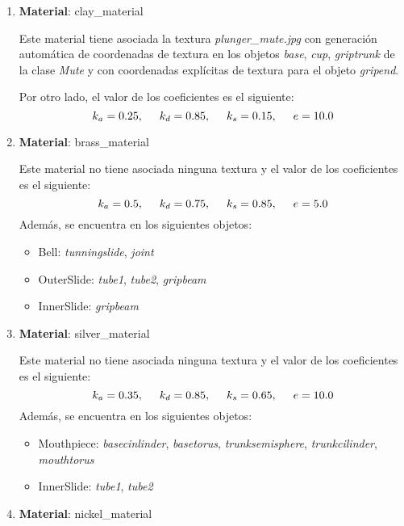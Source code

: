 \documentclass[10pt, a4paper]{article}
\begin{document}
\begin{enumerate}
	\item \textbf{Material}: clay\_material
	
	Este material tiene asociada la textura \emph{plunger\_mute.jpg} con generación automática de coordenadas de textura en los objetos \emph{base}, \emph{cup}, \emph{griptrunk} de la clase \emph{Mute} y con coordenadas explícitas de textura para el objeto \emph{gripend}.

	Por otro lado, el valor de los coeficientes es el siguiente:
	\begin{equation*}
		k_a = 0.25, \hspace{0.5cm} k_d = 0.85, \hspace{0.5cm} k_s = 0.15, \hspace{0.5cm} e = 10.0
	\end{equation*}
	\item \textbf{Material}: brass\_material
	
	Este material no tiene asociada ninguna textura y el valor de los coeficientes es el siguiente:
	\begin{equation*}
		k_a = 0.5, \hspace{0.5cm} k_d = 0.75, \hspace{0.5cm} k_s = 0.85, \hspace{0.5cm} e = 5.0
	\end{equation*}
	Además, se encuentra en los siguientes objetos:
	\begin{itemize}
		\item Bell: \emph{tunningslide}, \emph{joint}
		\item OuterSlide: \emph{tube1}, \emph{tube2}, \emph{gripbeam}
		\item InnerSlide: \emph{gripbeam}
	\end{itemize}
	\item \textbf{Material}: silver\_material
	
	Este material no tiene asociada ninguna textura y el valor de los coeficientes es el siguiente:
	\begin{equation*}
		k_a = 0.35, \hspace{0.5cm} k_d = 0.85, \hspace{0.5cm} k_s = 0.65, \hspace{0.5cm} e = 10.0
	\end{equation*}
	Además, se encuentra en los siguientes objetos:
	\begin{itemize}
		\item Mouthpiece: \emph{basecinlinder}, \emph{basetorus}, \emph{trunksemisphere}, \emph{trunkcilinder}, \emph{mouthtorus}
		\item InnerSlide: \emph{tube1}, \emph{tube2}
	\end{itemize}
	\item \textbf{Material}: nickel\_material
	

\end{enumerate}
\end{document}

